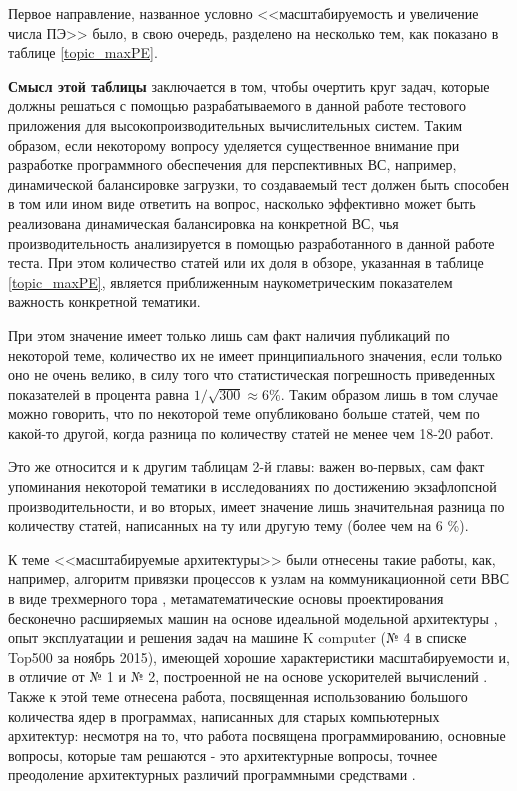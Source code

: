  
 Первое направление, названное условно <<масштабируемость и увеличение числа ПЭ>> было, в свою очередь, разделено
 на несколько тем, как показано в таблице \ref{topic_maxPE}. 
 
 \textbf{Смысл этой таблицы} заключается в том, чтобы очертить круг задач, которые должны решаться с помощью разрабатываемого в данной работе тестового приложения для высокопроизводительных вычислительных систем. Таким образом, если некоторому вопросу уделяется существенное внимание при разработке программного обеспечения для перспективных ВС, например, динамической балансировке загрузки, то создаваемый тест должен быть способен в том или ином виде ответить на вопрос, насколько эффективно может быть реализована динамическая балансировка на конкретной ВС, чья производительность анализируется в помощью разработанного в данной работе теста.
 При этом количество статей или их доля в обзоре, указанная в таблице  \ref{topic_maxPE}, является приближенным наукометрическим показателем важность конкретной тематики.
 
  При этом значение имеет только лишь сам факт наличия публикаций по некоторой теме, количество их не имеет принципиального значения, если только оно не очень велико, в силу того что статистическая погрешность приведенных показателей в процента равна $1/\sqrt{300} \approx 6 \%$.
  Таким образом лишь в том случае можно говорить, что по некоторой теме опубликовано больше статей, чем по какой-то другой, когда разница по количеству статей не менее чем 18-20 работ. 
  
  Это же относится и к другим таблицам 2-й главы: важен во-первых, сам факт упоминания некоторой тематики в исследованиях по достижению экзафлопсной производительности, и во вторых, имеет значение лишь значительная разница по количеству статей, написанных на ту или другую тему (более чем на 6 \%).

 
 К теме <<масштабируемые архитектуры>> были отнесены такие работы, как, например, алгоритм привязки процессов к узлам на коммуникационной сети ВВС в виде трехмерного тора \cite{Kodama2014362},
 метаматематические основы проектирования бесконечно расширяемых машин на основе идеальной модельной архитектуры \cite{Anderson20151828}, опыт эксплуатации и решения задач на машине K computer (№ 4 в списке Top500 за ноябрь 2015), имеющей хорошие характеристики масштабируемости и, в отличие от № 1 и № 2, построенной не на основе ускорителей вычислений \cite{Yamamoto2014576}. Также к этой теме отнесена работа, посвященная использованию большого количества ядер в программах, написанных для старых компьютерных архитектур: несмотря на то, что работа посвящена программированию, основные вопросы, которые там решаются - это архитектурные вопросы, точнее преодоление архитектурных различий программными средствами \cite{Lohner201353}.
 
